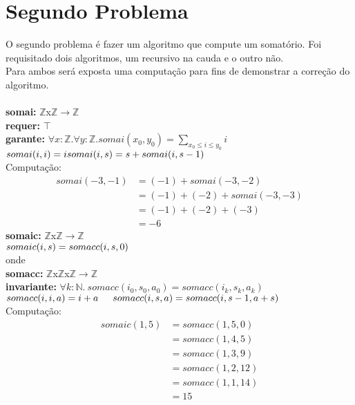 \documentclass{article}
\begin{document}
\section{Segundo Problema}
O segundo problema é fazer um algoritmo que compute um somatório.
Foi requisitado dois algoritmos, um recursivo na cauda e o outro não.\\
Para ambos será exposta uma computação para fins de demonstrar a correção do algoritmo.\\
\\
\noindent \textbf{somai:} $\mathbb{Z}$x$\mathbb{Z}$$ \rightarrow \mathbb{Z}$\\
\textbf{requer:} $\top$ \\
\textbf{garante:} $\forall x:\mathbb{Z}. \forall y:\mathbb{Z}. somai(x_0,y_0) = \sum\limits_{x_0 \le i \le y_0} i$\\
$somai(i, i) = i\\
somai(i, s) = s + somai(i, s-1)\\$
\\
Computação:
\begin{align*}
somai(-3, -1) &= (-1) + somai(-3, -2)\\
&= (-1) + (-2) + somai(-3, -3)\\
&= (-1) + (-2) + (-3)\\
&= -6
\end{align*}
\noindent \textbf{somaic:} $\mathbb{Z}$x$\mathbb{Z}$$ \rightarrow \mathbb{Z}$\\
$somaic(i, s) = somacc(i, s, 0)\\$
\\
onde\\
\indent \textbf{somacc:} $\mathbb{Z}$x$\mathbb{Z}$x$\mathbb{Z}$$ \rightarrow \mathbb{Z}$\\
\indent \textbf{invariante:} $\forall k:\mathbb{N}.\: somacc(i_0, s_0, a_0) = somacc(i_k, s_k, a_k)$\\
\indent $somacc(i, i, a) = i + a\\
\indent somacc(i, s, a) = somacc(i, s-1, a+s)\\$
\\
Computação:
\begin{align*}
somaic(1, 5) &= somacc(1, 5, 0)\\
&= somacc(1, 4, 5)\\
&= somacc(1, 3, 9)\\
&= somacc(1, 2, 12)\\
&= somacc(1, 1, 14)\\
&= 15
\end{align*}
\end{document}
